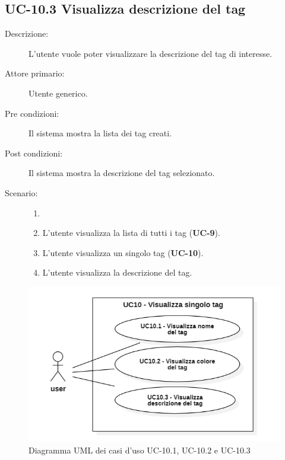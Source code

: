 \subsection{UC-10.3 Visualizza descrizione del tag}
\begin{description}
    \item[Descrizione:] L’utente vuole poter visualizzare la descrizione del tag di interesse.
    \item[Attore primario:] Utente generico.
    \item[Pre condizioni:] Il sistema mostra la lista dei tag creati.
    \item[Post condizioni:] Il sistema mostra la descrizione del tag selezionato.
    \item[Scenario:]
    \begin{enumerate}
        \item[]
        \item L’utente visualizza la lista di tutti i tag (\textbf{UC-9}).
        \item L'utente visualizza un singolo tag (\textbf{UC-10}).
        \item L'utente visualizza la descrizione del tag.
    \end{enumerate}
\end{description}

\begin{figure}[H]
    \centering
    \includegraphics[width=0.8\linewidth]{UC10.1.png}
    \caption{Diagramma UML dei casi d'uso UC-10.1, UC-10.2 e UC-10.3}
    \label{fig:UC10.1}
\end{figure}

